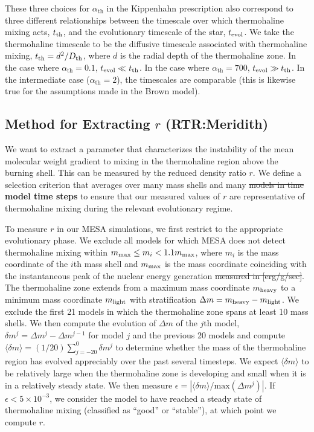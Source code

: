 These three choices for $\alpha_{\text{th}}$ in the Kippenhahn prescription also correspond to three different relationships between the timescale over which thermohaline mixing acts, $t_{\rm th}$, and the evolutionary timescale of the star, $t_{\rm{evol}}$. 
We take the thermohaline timescale to be the diffusive timescale associated with thermohaline mixing, $t_{\rm th} = d^2/D_{\rm th}$, where $d$ is the radial depth of the thermohaline zone.
In the case where $\alpha_{\text{th}} = 0.1$, 
$t_{\rm evol} \ll t_{\rm th}$. In the case where $\alpha_{\text{th}} = 700$, 
$t_{\rm evol} \gg t_{\rm th}$. In the intermediate case ($\alpha_{\text{th}}= 2$), the timescales are comparable (this is likewise true for the assumptions made in the Brown model).


\subsection{Method for Extracting $r$ \textbf{(RTR:Meridith)}}
%
We want to extract a parameter that characterizes the instability of the mean molecular weight gradient to mixing in the thermohaline region above the burning shell. This can be measured by the reduced density ratio $r$.
We define a selection criterion that averages over many mass shells and many \sout{models in time} \textbf{model time steps} to ensure that our measured values of $r$ are representative of thermohaline mixing during the relevant evolutionary regime.

To measure $r$ in our MESA simulations, we first restrict to the appropriate evolutionary phase. We exclude all models for which MESA does not detect thermohaline mixing within $m_{\rm max} \leq m_i < 1.1 m_{\rm max}$, where $m_i$ is the mass coordinate of the $i$th mass shell and $m_{\rm max}$ is the mass coordinate coinciding with the instantaneous peak of the nuclear energy generation \sout{measured in [erg/g/sec]}.
The thermohaline zone extends from a maximum mass coordinate $m_{\rm heavy}$ to a minimum mass coordinate $m_{\rm light}$ with stratification $\Delta m = m_{\rm heavy} - m_{\rm light}$.
We exclude the first 21 models in which the thermohaline zone spans at least 10 mass shells.
We then compute the evolution of $\Delta m$ of the $j$th model, $\delta m^j = \Delta m^{j} - \Delta m^{j-1}$ for model $j$ and the previous 20 models and compute $\langle \delta m \rangle = (1/20)\sum_{j=-20}^0 \delta m^j$ to determine whether the mass of the thermohaline region has evolved appreciably over the past several timesteps. We expect $\langle \delta m \rangle$ to be relatively large when the thermohaline zone is developing and small when it is in a relatively steady state.
We then measure $\epsilon = |\langle \delta m \rangle / \mathrm{max}(\Delta m^j)|$. If $\epsilon < 5 \times 10^{-3}$, we consider the model to have reached a steady state of thermohaline mixing (classified as ``good'' or ``stable''), at which point we compute $r$.

